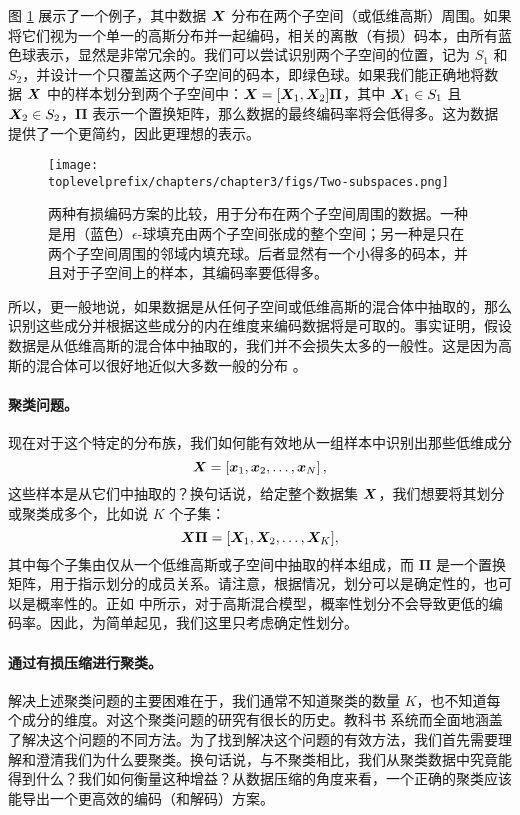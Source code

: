 \documentclass[../../book-main_zh.tex]{subfiles}
\begin{document}
\begin{example}
	图 \ref{fig:two-subspaces} 展示了一个例子，其中数据 $\bm{X}$ 分布在两个子空间（或低维高斯）周围。如果将它们视为一个单一的高斯分布并一起编码，相关的离散（有损）码本，由所有蓝色球表示，显然是非常冗余的。我们可以尝试识别两个子空间的位置，记为 $S_1$ 和 $S_2$，并设计一个只覆盖这两个子空间的码本，即绿色球。如果我们能正确地将数据 $\bm{X}$ 中的样本划分到两个子空间中：$\bm{X} = [\bm{X}_1, \bm{X}_2]\bm \Pi$，其中 $\bm{X}_1 \in S_1$ 且 $\bm{X}_2 \in S_2$，$\bm \Pi$ 表示一个置换矩阵，那么数据的最终编码率将会低得多。这为数据提供了一个更简约，因此更理想的表示。
\end{example}

\begin{figure}
	\centering
	\texttt{[image: \\toplevelprefix/chapters/chapter3/figs/Two-subspaces.png]}
	\caption{两种有损编码方案的比较，用于分布在两个子空间周围的数据。一种是用（蓝色）$\epsilon$-球填充由两个子空间张成的整个空间；另一种是只在两个子空间周围的邻域内填充球。后者显然有一个小得多的码本，并且对于子空间上的样本，其编码率要低得多。}
	\label{fig:two-subspaces}
\end{figure}

所以，更一般地说，如果数据是从任何子空间或低维高斯的混合体中抽取的，那么识别这些成分并根据这些成分的内在维度来编码数据将是可取的。事实证明，假设数据是从低维高斯的混合体中抽取的，我们并不会损失太多的一般性。这是因为高斯的混合体可以很好地近似大多数一般的分布 \cite{borkar2016gaussian}。

\paragraph{聚类问题。}
现在对于这个特定的分布族，我们如何能有效地从一组样本中识别出那些低维成分
\begin{equation}
	\bm{X} = \left[\bm{x}_1, \bm{x}_2, \ldots, \bm{x}_N\right],
\end{equation}
这些样本是从它们中抽取的？换句话说，给定整个数据集 $\bm{X}$，我们想要将其划分或聚类成多个，比如说 $K$ 个子集：
\begin{equation}
	\bm{X}\bm \Pi = [\bm{X}_1, \bm{X}_2, \dots, \bm{X}_K],
\end{equation}
其中每个子集由仅从一个低维高斯或子空间中抽取的样本组成，而 $\bm \Pi$ 是一个置换矩阵，用于指示划分的成员关系。请注意，根据情况，划分可以是确定性的，也可以是概率性的。正如 \cite{ma2007segmentation} 中所示，对于高斯混合模型，概率性划分不会导致更低的编码率。因此，为简单起见，我们这里只考虑确定性划分。

\paragraph{通过有损压缩进行聚类。}
解决上述聚类问题的主要困难在于，我们通常不知道聚类的数量 $K$，也不知道每个成分的维度。对这个聚类问题的研究有很长的历史。教科书 \cite{GPCA} 系统而全面地涵盖了解决这个问题的不同方法。为了找到解决这个问题的有效方法，我们首先需要理解和澄清我们为什么要聚类。换句话说，与不聚类相比，我们从聚类数据中究竟能得到什么？我们如何衡量这种增益？从数据压缩的角度来看，一个正确的聚类应该能导出一个更高效的编码（和解码）方案。
\end{document}
